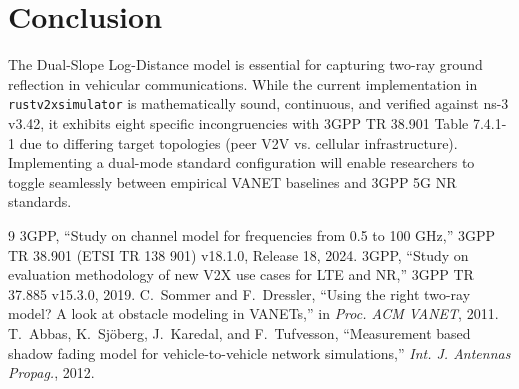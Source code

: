 \documentclass[11pt,a4paper]{article}
\begin{document}
\section{Conclusion}
The Dual-Slope Log-Distance model is essential for capturing two-ray ground reflection in vehicular communications. While the current implementation in \texttt{rustv2xsimulator} is mathematically sound, continuous, and verified against ns-3 v3.42, it exhibits eight specific incongruencies with 3GPP TR 38.901 Table 7.4.1-1 due to differing target topologies (peer V2V vs. cellular infrastructure). Implementing a dual-mode standard configuration will enable researchers to toggle seamlessly between empirical VANET baselines and 3GPP 5G NR standards.

\begin{thebibliography}{9}
3GPP, ``Study on channel model for frequencies from 0.5 to 100 GHz,'' 3GPP TR 38.901 (ETSI TR 138 901) v18.1.0, Release 18, 2024.
3GPP, ``Study on evaluation methodology of new V2X use cases for LTE and NR,'' 3GPP TR 37.885 v15.3.0, 2019.
C.~Sommer and F.~Dressler, ``Using the right two-ray model? A look at obstacle modeling in VANETs,'' in \emph{Proc. ACM VANET}, 2011.
T.~Abbas, K.~Sj{\"o}berg, J.~Karedal, and F.~Tufvesson, ``Measurement based shadow fading model for vehicle-to-vehicle network simulations,'' \emph{Int. J. Antennas Propag.}, 2012.
\end{thebibliography}
\end{document}
